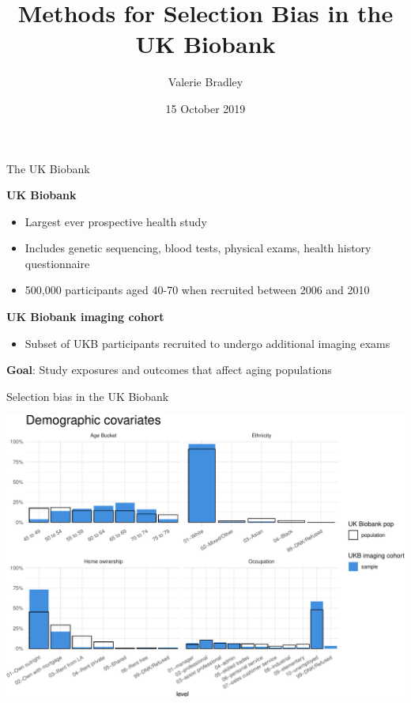 \documentclass[
  ignorenonframetext,
]{beamer}
\institute[University of Oxford]{University of Oxford, Department of Statistics}
\title{Methods for Selection Bias in the UK Biobank}
\author{Valerie Bradley}
\date{15 October 2019}
\providecommand{\tightlist}{%
  \setlength{\itemsep}{0pt}\setlength{\parskip}{0pt}}
\begin{document}
\frame{\titlepage}

\begin{frame}{The UK Biobank}
\protect\hypertarget{the-uk-biobank}{}

\textbf{UK Biobank}

\begin{itemize}
\tightlist
\item
  Largest ever prospective health study
\item
  Includes genetic sequencing, blood tests, physical exams, health
  history questionnaire
\item
  500,000 participants aged 40-70 when recruited between 2006 and 2010
\end{itemize}

\textbf{UK Biobank imaging cohort}

\begin{itemize}
\tightlist
\item
  Subset of UKB participants recruited to undergo additional imaging
  exams
\end{itemize}

\textbf{Goal}: Study exposures and outcomes that affect aging
populations

\end{frame}

\begin{frame}{Selection bias in the UK Biobank}
\protect\hypertarget{selection-bias-in-the-uk-biobank}{}

\begin{center}\includegraphics[width=0.95\linewidth]{fmrib-deck-20191002_files/figure-beamer/plot-selection-bias-demos-1} \end{center}

\end{frame}
\end{document}
